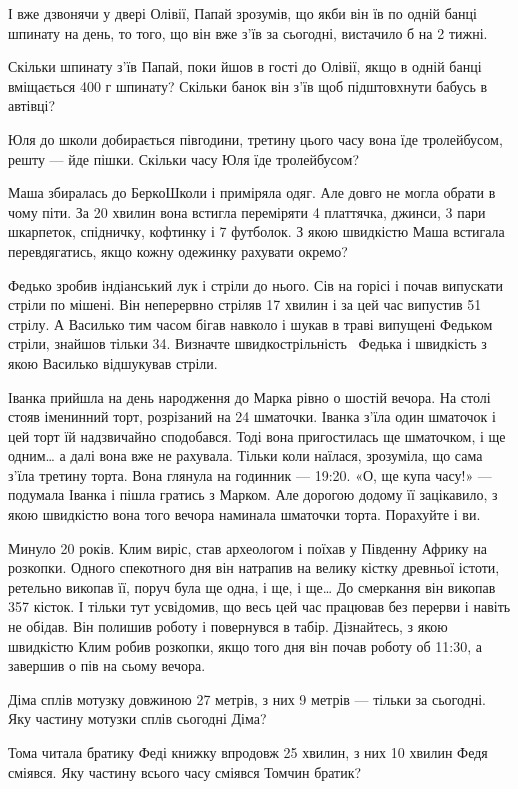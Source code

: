 І вже дзвонячи у двері Олівії, Папай зрозумів, що якби він їв по одній
банці шпинату на день, то того, що він вже з’їв за сьогодні,
вистачило б на 2 тижні.

Скільки шпинату з’їв Папай, поки йшов в гості до Олівії, якщо в одній
банці вміщається 400 г шпинату?
Скільки банок він з’їв щоб підштовхнути бабусь в автівці?


\problem
Юля до школи добирається півгодини,
третину цього часу вона їде тролейбусом, решту --- йде пішки.
Скільки часу Юля їде тролейбусом?


\problem
Маша збиралась до БеркоШколи і приміряла одяг.
Але довго не могла обрати в чому піти.
За 20 хвилин вона встигла переміряти 4 платтячка, джинси, 3 пари шкарпеток,
спідничку, кофтинку і 7 футболок.
З якою швидкістю Маша встигала перевдягатись,
якщо кожну одежинку рахувати окремо?


\problem
Федько зробив індіанський лук і стріли до нього.
Сів на горісі і почав випускати стріли по мішені.
Він неперервно стріляв 17 хвилин і за цей час випустив 51 стрілу.
А Василько тим часом бігав навколо і шукав в траві випущені Федьком стріли,
знайшов тільки 34.
Визначте швидкострільність  Федька і швидкість з якою Василько
відшукував стріли.


\problem
Іванка прийшла на день народження до Марка рівно о шостій вечора.
На столі стояв іменинний торт, розрізаний на 24 шматочки.
Іванка з’їла один шматочок і цей торт їй надзвичайно сподобався.
Тоді вона пригостилась ще шматочком, і ще одним… а далі вона вже не рахувала.
Тільки коли наїлася, зрозуміла, що сама з’їла третину торта.
Вона глянула на годинник --- 19:20.
«О, ще купа часу!» --- подумала Іванка і пішла гратись з Марком.
Але дорогою додому її зацікавило, з якою швидкістю вона того
вечора наминала шматочки торта. Порахуйте і ви.


\problem
Минуло 20 років. Клим виріс, став археологом і поїхав у Південну Африку
на розкопки. Одного спекотного дня він натрапив на велику кістку
древньої істоти, ретельно викопав її, поруч була ще одна, і ще, і ще…
До смеркання він викопав 357 кісток. І тільки тут усвідомив, що весь
цей час працював без перерви і навіть не обідав. Він полишив роботу
і повернувся в табір. Дізнайтесь, з якою швидкістю Клим робив розкопки,
якщо того дня він почав роботу об 11:30, а завершив о пів на сьому вечора.


\problem
Діма сплів мотузку довжиною 27 метрів, з них 9 метрів --- тільки за сьогодні.
Яку частину мотузки сплів сьогодні Діма?


\problem
Тома читала братику Феді книжку впродовж 25 хвилин,
з них 10 хвилин Федя сміявся.
Яку частину всього часу сміявся Томчин братик?
